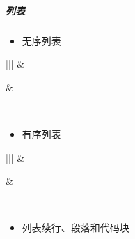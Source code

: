\documentclass[a4paper,10pt,english]{sphinxmanual}
\begin{document}
\subparagraph{列表}
\label{\detokenize{sphinx/1-generate/4-edit:id8}}\begin{itemize}
\item {} 
无序列表

\end{itemize}


\begin{savenotes}\sphinxattablestart
\centering
\begin{tabular}[t]{|||}
\hline
{}\relax &\relax \\
\hline\begin{sphinxfigure-in-table}
\centering

\noindent{}
\end{sphinxfigure-in-table}\relax
&\begin{sphinxfigure-in-table}
\centering

\noindent{}
\end{sphinxfigure-in-table}\relax
\\
\hline
\end{tabular}
\par
\sphinxattableend\end{savenotes}
\begin{itemize}
\item {} 
有序列表

\end{itemize}


\begin{savenotes}\sphinxattablestart
\centering
\begin{tabular}[t]{|||}
\hline
{}\relax &\relax \\
\hline\begin{sphinxfigure-in-table}
\centering

\noindent{}
\end{sphinxfigure-in-table}\relax
&\begin{sphinxfigure-in-table}
\centering

\noindent{}
\end{sphinxfigure-in-table}\relax
\\
\hline
\end{tabular}
\par
\sphinxattableend\end{savenotes}
\begin{itemize}
\item {} 
列表续行、段落和代码块

\end{itemize}
\end{document}
